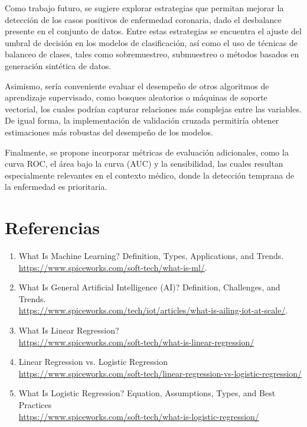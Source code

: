 \documentclass{article}
\begin{document}
Como trabajo futuro, se sugiere explorar estrategias que permitan mejorar la detección de los casos positivos de enfermedad coronaria, dado el desbalance presente en el conjunto de datos. Entre estas estrategias se encuentra el ajuste del umbral de decisión en los modelos de clasificación, así como el uso de técnicas de balanceo de clases, tales como sobremuestreo, submuestreo o métodos basados en generación sintética de datos.

Asimismo, sería conveniente evaluar el desempeño de otros algoritmos de aprendizaje supervisado, como bosques aleatorios o máquinas de soporte vectorial, los cuales podrían capturar relaciones más complejas entre las variables. De igual forma, la implementación de validación cruzada permitiría obtener estimaciones más robustas del desempeño de los modelos.

Finalmente, se propone incorporar métricas de evaluación adicionales, como la curva ROC, el área bajo la curva (AUC) y la sensibilidad, las cuales resultan especialmente relevantes en el contexto médico, donde la detección temprana de la enfermedad es prioritaria.


\newpage

\section{Referencias}

\begin{enumerate}
    \item What Is Machine Learning? Definition, Types, Applications, and Trends. \\
    \url{https://www.spiceworks.com/soft-tech/what-is-ml/}.
    \item What Is General Artificial Intelligence (AI)? Definition, Challenges, and Trends. \\
    \url{https://www.spiceworks.com/tech/iot/articles/what-is-ailing-iot-at-scale/}.
    \item What Is Linear Regression?  \\
    \url{https://www.spiceworks.com/soft-tech/what-is-linear-regression/}
    \item Linear Regression vs. Logistic Regression \\
    \url{https://www.spiceworks.com/soft-tech/linear-regression-vs-logistic-regression/}
    \item What Is Logistic Regression? Equation, Assumptions, Types, and Best Practices \\
    \url{https://www.spiceworks.com/soft-tech/what-is-logistic-regression/}
    
    
\end{enumerate}
\end{document}
